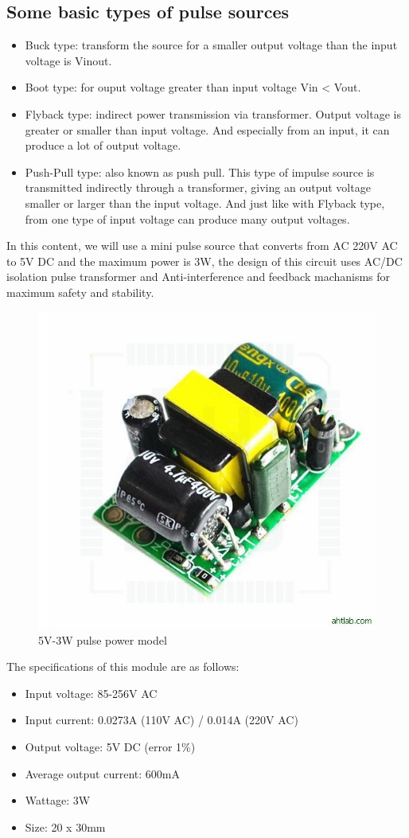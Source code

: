 \documentclass[a4paper]{report}
\begin{document}
    \subsection{Some basic types of pulse sources}
        \begin{itemize}
            \item Buck type: transform the source for a smaller output voltage than the input voltage is Vinout.
            \item Boot type: for ouput voltage greater than input voltage Vin < Vout.
            \item Flyback type: indirect power transmission via transformer. Output voltage is greater or smaller 
            than input voltage. And especially from an input, it can produce a lot of output voltage. 
            \item Push-Pull type: also known as push pull. This type of impulse source is transmitted indirectly 
            through a transformer, giving an output voltage smaller or larger than the input voltage. And just like 
            with Flyback type, from one type of input voltage can produce many output voltages.
        \end{itemize}
        In this content, we will use a mini pulse source that converts from AC 220V AC to 5V DC and the 
        maximum power is 3W, the design of this circuit uses AC/DC isolation pulse transformer and Anti-interference 
        and feedback machanisms for maximum safety and stability. 
        \begin{figure}[ht]
            \centering
            \includegraphics[width=0.5\linewidth]{pic1.jpg}
            \caption{\label{fig:boat}5V-3W pulse power model}
        \end{figure}
        The specifications of this module are as follows: 
        \begin{itemize}
            \item Input voltage: 85-256V AC
            \item Input current: 0.0273A (110V AC) / 0.014A (220V AC)
            \item Output voltage: 5V DC (error 1\%)
            \item Average output current: 600mA
            \item Wattage: 3W
            \item Size: 20 x 30mm
        \end{itemize}
\end{document}
